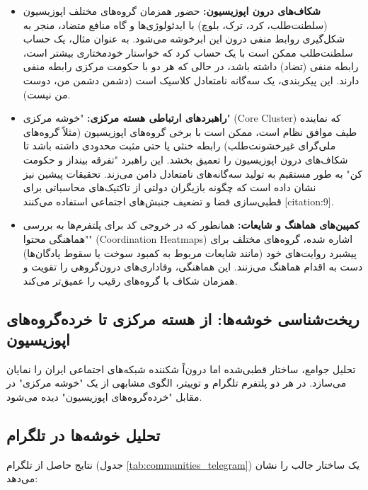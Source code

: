 \documentclass{article}
\begin{document}
	\begin{itemize}
		\item \textbf{شکاف‌های درون اپوزیسیون:} حضور همزمان گروه‌های مختلف اپوزیسیون (سلطنت‌طلب، کرد، ترک، بلوچ) با ایدئولوژی‌ها و گاه منافع متضاد، منجر به شکل‌گیری روابط منفی درون این ابرخوشه می‌شود. به عنوان مثال، یک حساب سلطنت‌طلب ممکن است با یک حساب کرد که خواستار خودمختاری بیشتر است، رابطه منفی (تضاد) داشته باشد، در حالی که هر دو با حکومت مرکزی رابطه منفی دارند. این پیکربندی، یک سه‌گانه نامتعادل کلاسیک است (دشمن دشمن من، دوست من نیست).
		\item \textbf{راهبردهای ارتباطی هسته مرکزی:} "خوشه مرکزی" (Core Cluster) که نماینده طیف موافق نظام است، ممکن است با برخی گروه‌های اپوزیسیون (مثلاً گروه‌های ملی‌گرای غیرخشونت‌طلب) رابطه خنثی یا حتی مثبت محدودی داشته باشد تا شکاف‌های درون اپوزیسیون را تعمیق بخشد. این راهبرد "تفرقه بینداز و حکومت کن" به طور مستقیم به تولید سه‌گانه‌های نامتعادل دامن می‌زند. تحقیقات پیشین نیز نشان داده است که چگونه بازیگران دولتی از تاکتیک‌های محاسباتی برای قطبی‌سازی فضا و تضعیف جنبش‌های اجتماعی استفاده می‌کنند [citation:9].
		\item \textbf{کمپین‌های هماهنگ و شایعات:} همانطور که در خروجی کد برای پلتفرم‌ها به بررسی "هماهنگی محتوا" (Coordination Heatmaps) اشاره شده، گروه‌های مختلف برای پیشبرد روایت‌های خود (مانند شایعات مربوط به کمبود سوخت یا سقوط پادگان‌ها) دست به اقدام هماهنگ می‌زنند. این هماهنگی، وفاداری‌های درون‌گروهی را تقویت و همزمان شکاف با گروه‌های رقیب را عمیق‌تر می‌کند.
	\end{itemize}
	
	\subsection{ریخت‌شناسی خوشه‌ها: از هسته مرکزی تا خرده‌گروه‌های اپوزیسیون}
	تحلیل جوامع، ساختار قطبی‌شده اما درون‌اً شکننده شبکه‌های اجتماعی ایران را نمایان می‌سازد. در هر دو پلتفرم تلگرام و توییتر، الگوی مشابهی از یک "خوشه مرکزی" در مقابل "خرده‌گروه‌های اپوزیسیون" دیده می‌شود.
	
	\subsection{تحلیل خوشه‌ها در تلگرام}
	نتایج حاصل از تلگرام (جدول \ref{tab:communities_telegram}) یک ساختار جالب را نشان می‌دهد:
	
\end{document}
